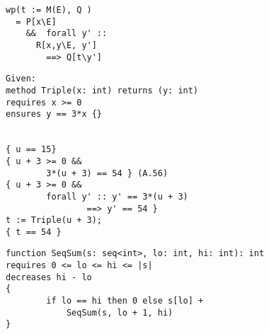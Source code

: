 \begin{verbatim}
wp(t := M(E), Q )
  = P[x\E]
    &&  forall y' ::
      R[x,y\E, y'] 
        ==> Q[t\y']
\end{verbatim}
\begin{verbatim}
Given:
method Triple(x: int) returns (y: int)
requires x >= 0
ensures y == 3*x {}


{ u == 15}
{ u + 3 >= 0 &&
        3*(u + 3) == 54 } (A.56)
{ u + 3 >= 0 &&
        forall y' :: y' == 3*(u + 3)
                ==> y' == 54 }
t := Triple(u + 3);
{ t == 54 }

\end{verbatim}
\begin{verbatim}
function SeqSum(s: seq<int>, lo: int, hi: int): int
requires 0 <= lo <= hi <= |s|
decreases hi - lo
{
        if lo == hi then 0 else s[lo] +
            SeqSum(s, lo + 1, hi)
}
\end{verbatim}